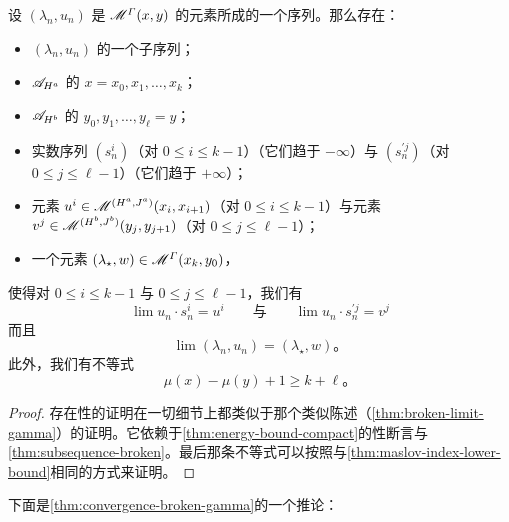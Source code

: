 \begin{theorem}\label{thm:convergence-broken-gamma}
设 $(\lambda_{n},u_{n})$ 是 $\mathscr{M}^{\varGamma}(x,y)$ 的元素所成的一个序列。那么存在：
\begin{itemize}
\item $(\lambda_{n},u_{n})$ 的一个子序列；
\item $\mathscr{A}_{H^{a}}$ 的\trCriticalPoint{} $x=x_{0},x_{1},\dots,x_{k}$；
\item $\mathscr{A}_{H^{b}}$ 的\trCriticalPoint{} $y_{0},y_{1},\dots,y_{\ell}=y$；
\item 实数序列 $(s^{i}_{n})$（对 $0\le i\le k-1$）（它们趋于 $-\infty$）与 $(s_{n}^{\prime j})$（对 $0\le j\le\ell-1$）（它们趋于 $+\infty$）；
\item 元素 $u^{i}\in\mathscr{M}^{(H^{a},J^{a})}(x_{i},x_{i+1})$（对 $0\le i\le k-1$）与元素 $v^{j}\in\mathscr{M}^{(H^{b},J^{b})}(y_{j},y_{j+1})$（对 $0\le j\le\ell-1$）；
\item 一个元素 $(\lambda_{\star},w)\in\mathscr{M}^{\varGamma}(x_{k},y_{0})$，
\end{itemize}
使得对 $0\le i\le k-1$ 与 $0\le j\le\ell-1$，我们有
\[
\lim u_{n}\cdot s^{i}_{n}=u^{i}
\qquad\text{与}\qquad
\lim u_{n}\cdot s_{n}^{\prime j}=v^{j}
\]
而且
\[
\lim(\lambda_{n},u_{n})=(\lambda_{\star},w)\text{。}
\]
此外，我们有不等式
\[
\mu(x)-\mu(y)+1\ge k+\ell\text{。}
\]
\end{theorem}

\begin{proof}
存在性的证明在一切细节上都类似于那个类似陈述（\cref{thm:broken-limit-gamma}）的证明。它依赖于\cref{thm:energy-bound-compact}的\trCompact{}性断言与\cref{thm:subsequence-broken}。最后那条不等式可以按照与\cref{thm:maslov-index-lower-bound}相同的方式来证明。
\end{proof}

下面是\cref{thm:convergence-broken-gamma}的一个推论：

